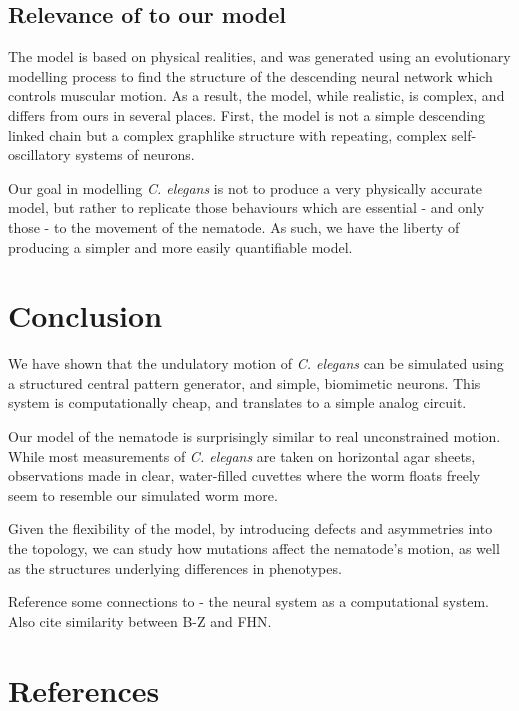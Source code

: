 \documentclass[
    11pt,
]{article}
\begin{document}
\subsection{Relevance of \citet{izquierdo2018} to our model}

The \citet{izquierdo2018} model is based on physical realities, and was generated using an evolutionary modelling process to find the structure of the descending neural network which controls muscular motion.  As a result, the model, while realistic, is complex, and differs from ours in several places.  First, the model is not a simple descending linked chain but a complex graphlike structure with repeating, complex self-oscillatory systems of neurons.

Our goal in modelling \emph{C. elegans} is not to produce a very physically accurate model, but rather to replicate those behaviours which are essential - and only those - to the movement of the nematode.  As such, we have the liberty of producing a simpler and more easily quantifiable model.

\section{Conclusion}

We have shown that the undulatory motion of \emph{C. elegans} can be simulated using a structured central pattern generator, and simple, biomimetic neurons.  This system is computationally cheap, and translates to a simple analog circuit.

Our model of the nematode is surprisingly similar to real unconstrained motion.  While most measurements of \emph{C. elegans} are taken on horizontal agar sheets, observations made in clear, water-filled cuvettes where the worm floats freely seem to resemble our simulated worm more.

Given the flexibility of the model, by introducing defects and asymmetries into the topology, we can study how mutations affect the nematode's motion, as well as the structures underlying differences in phenotypes.


Reference some connections to \citet{adamatzky2008} - the neural system as a computational system.  Also cite similarity between B-Z and FHN.

\section{References}

% 
\printbibliography[heading=none]
\end{document}
